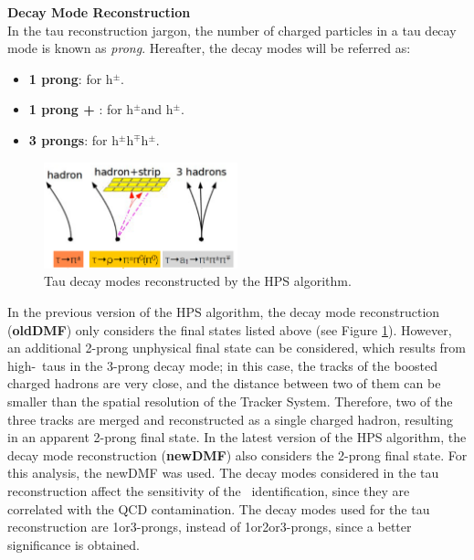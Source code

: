 \textbf{Decay Mode Reconstruction}\\

\noindent In the tau reconstruction jargon, the number of charged particles in a 
tau decay mode is known as \textit{prong}. Hereafter, the decay modes will 
be referred as:
\begin{itemize}
 \item \textbf{1 prong}: for h$^{\pm}$.
 \item \textbf{1 prong + \picero}: for h$^{\pm}$\picero and h$^{\pm}$\picero\picero.
 \item \textbf{3 prongs}: for h$^{\pm}$h$^{\mp}$h$^{\pm}$.
\end{itemize}

\begin{figure}[ht]
  \begin{center}
    \includegraphics[width=0.5\textwidth]{figuras/Chapter3/taudecays.png}
    \caption{Tau decay modes reconstructed by the HPS algorithm.}
    \label{fig:taudecaysReco}
  \end{center}
\end{figure} 

\noindent In the previous version of the HPS algorithm, the decay mode 
reconstruction (\textbf{oldDMF}) only considers the final states listed 
above (see Figure \ref{fig:taudecaysReco}). However, an additional 2-prong unphysical 
final state can be considered, which results from high-\pt~taus in the 3-prong decay mode;
in this case, the tracks of the boosted charged hadrons are very close, 
and the  distance between two of them can be smaller than the spatial resolution 
of the Tracker System. Therefore, two of the three tracks are 
merged and reconstructed as a single charged hadron, resulting in an 
apparent 2-prong final state. In the latest version of the HPS algorithm, the decay mode 
reconstruction (\textbf{newDMF}) also considers the 2-prong final state. For this analysis,
the newDMF was used. The decay modes considered in the tau reconstruction 
affect the sensitivity of the \Zprime~identification, since they are correlated 
with the QCD contamination. The decay modes used for the 
tau reconstruction are 1or3-prongs, instead of 1or2or3-prongs, since a better 
significance is obtained. 

